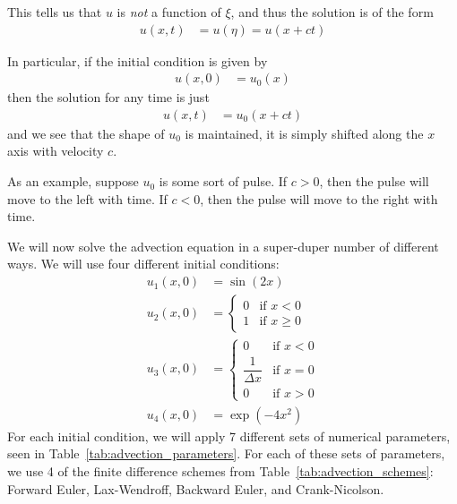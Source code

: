 \documentclass[twocolumn]{myarticle}
\begin{document}
This tells us that $ u $ is \emph{not} a function of $ \xi $, and thus the solution is of the form
\begin{align}
    u(x,t) &= u(\eta) = u(x + ct)
\end{align}

In particular, if the initial condition is given by
\begin{align}
    u(x,0) &= u_0(x)
\end{align}
then the solution for any time is just
\begin{align}
    u(x,t) &= u_0(x + ct)
\end{align}
and we see that the shape of $ u_0 $ is maintained, it is simply shifted along the $ x $ axis with velocity $ c $.

As an example, suppose $ u_0 $ is some sort of pulse.
If $ c > 0 $, then the pulse will move to the left with time.
If $ c < 0 $, then the pulse will move to the right with time.

We will now solve the advection equation in a super-duper number of different ways.
We will use four different initial conditions:
\begin{align}
    u_1(x,0) &= \sin(2x)
    \\
    u_2(x,0) &= \begin{cases} 0 & \text{if } x < 0 \\ 1 & \text{if } x \geq 0 \end{cases}
    \\
    u_3(x,0) &= \begin{cases} 0 & \text{if } x < 0 \\ \dfrac{1}{\Delta x} & \text{if } x = 0 \\ 0 & \text{if } x > 0 \end{cases}
    \\
    u_4(x,0) &= \exp\left( -4 x^2 \right)
\end{align}
For each initial condition, we will apply 7 different sets of numerical parameters, seen in Table~\ref{tab:advection_parameters}.
For each of these sets of parameters, we use 4 of the finite difference schemes from Table~\ref{tab:advection_schemes}: Forward Euler, Lax-Wendroff, Backward Euler, and Crank-Nicolson.
\end{document}
